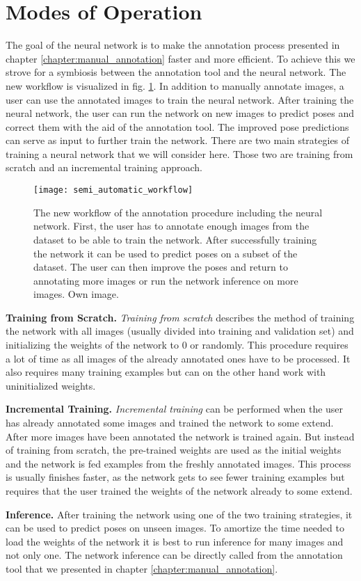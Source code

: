 \section{Modes of Operation} \label{section:modes_of_operation}

The goal of the neural network is to make the annotation process presented in chapter \ref{chapter:manual_annotation} faster and more efficient. To achieve this we strove for a symbiosis between the annotation tool and the neural network. The new workflow is visualized in fig. \ref{fig:semi_automatic_workflow}. In addition to manually annotate images, a user can use the annotated images to train the neural network. After training the neural network, the user can run the network on new images to predict poses and correct them with the aid of the annotation tool. The improved pose predictions can serve as input to further train the network. There are two main strategies of training a neural network that we will consider here. Those two are training from scratch and an incremental training approach.

\begin{figure}[!tbp]
	\centering
    \texttt{[image: semi\_automatic\_workflow]}
    \caption{The new workflow of the annotation procedure including the neural network. First, the user has to annotate enough images from the dataset to be able to train the network. After successfully training the network it can be used to predict poses on a subset of the dataset. The user can then improve the poses and return to annotating more images or run the network inference on more images. Own image.}
    	\label{fig:semi_automatic_workflow}
\end{figure}

\noindent\textbf{Training from Scratch.} \textit{Training from scratch} describes the method of training the network with all images (usually divided into training and validation set) and initializing  the weights of the network to 0 or randomly. This procedure requires a lot of time as all images of the already annotated ones have to be processed. It also requires many training examples but can on the other hand work with uninitialized weights.

\noindent\textbf{Incremental Training.} \textit{Incremental training} can be performed when the user has already annotated some images and trained the network to some extend. After more images have been annotated the network is trained again. But instead of training from scratch, the pre-trained weights are used as the initial weights and the network is fed examples from the freshly annotated images. This process is usually finishes faster, as the network gets to see fewer training examples but requires that the user trained the weights of the network already to some extend.

\noindent\textbf{Inference.}  After training the network using one of the two training strategies, it can be used to predict poses on unseen images. To amortize the time needed to load the weights of the network it is best to run inference for many images and not only one. The network inference can be directly called from the annotation tool that we presented in chapter \ref{chapter:manual_annotation}.